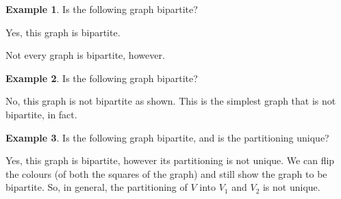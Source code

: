 \documentclass[]{article}
\theoremstyle{definition}
\newtheorem{ex}{Example}[section]
\begin{document}
			\begin{ex}
				Is the following graph bipartite?
				\begin{center}
				\end{center}
				Yes, this graph is bipartite.
			\end{ex}

			Not every graph is bipartite, however.
			\begin{ex}
				Is the following graph bipartite?
				\begin{center}
				\end{center}
				No, this graph is not bipartite as shown. This is the simplest graph that is not bipartite, in fact.
			\end{ex}

			\begin{ex}
				Is the following graph bipartite, and is the partitioning unique?
				\begin{center}
				\end{center}
				Yes, this graph is bipartite, however its partitioning is not unique. We can flip the colours (of both the squares of the graph) and still show the graph to be bipartite. So, in general, the partitioning of $V$ into $V_1$ and $V_2$ is not unique.
			\end{ex}
\end{document}
